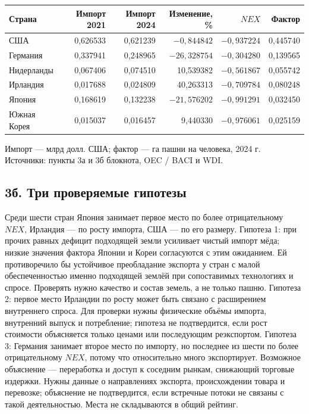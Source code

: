 \documentclass[11pt,a4paper]{article}
\begin{document}
\begin{center}
\small
\begin{tabular}{lrrrrr}
\toprule
Страна & Импорт 2021 & Импорт 2024 & Изменение, \% & $NEX$ & Фактор\\
\midrule
США & 0,626533 & 0,621239 & $-0,844842$ & $-0,937224$ & 0,445740\\
Германия & 0,337941 & 0,248965 & $-26,328754$ & $-0,304280$ & 0,139565\\
Нидерланды & 0,067406 & 0,074510 & 10,539382 & $-0,561867$ & 0,055742\\
Ирландия & 0,017688 & 0,024809 & 40,263313 & $-0,709784$ & 0,080248\\
Япония & 0,168619 & 0,132238 & $-21,576202$ & $-0,991291$ & 0,032450\\
Южная Корея & 0,015037 & 0,016457 & 9,440330 & $-0,976061$ & 0,025159\\
\bottomrule
\end{tabular}
\end{center}
\noindent Импорт --- млрд долл. США; фактор --- га пашни на человека, 2024 г. Источники: пункты 3а и 3б блокнота, OEC / BACI и WDI.

\subsection*{3б. Три проверяемые гипотезы}
Среди шести стран Япония занимает первое место по более отрицательному $NEX$, Ирландия --- по росту импорта, США --- по его размеру. Гипотеза 1: при прочих равных дефицит подходящей земли усиливает чистый импорт мёда; низкие значения фактора Японии и Кореи согласуются с этим ожиданием. Ей противоречило бы устойчивое преобладание экспорта у стран с малой обеспеченностью именно подходящей землёй при сопоставимых технологиях и спросе. Проверять нужно качество и состав земель, а не только пашню. Гипотеза 2: первое место Ирландии по росту может быть связано с расширением внутреннего спроса. Для проверки нужны физические объёмы импорта, внутренний выпуск и потребление; гипотеза не подтвердится, если рост стоимости объясняется только ценами или последующим реэкспортом. Гипотеза 3: Германия занимает второе место по импорту, но последнее из шести по более отрицательному $NEX$, потому что относительно много экспортирует. Возможное объяснение --- переработка и доступ к соседним рынкам, снижающий торговые издержки. Нужны данные о направлениях экспорта, происхождении товара и перевозке; объяснение не подтвердится, если встречные потоки не связаны с такой деятельностью. Места не складываются в общий рейтинг.
\end{document}
